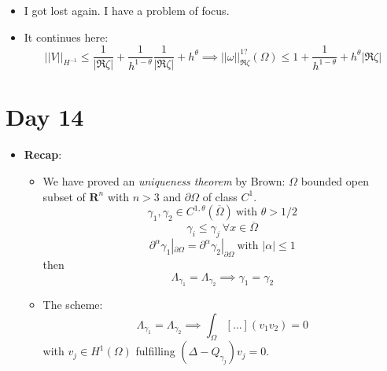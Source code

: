 \documentclass{article}
\begin{document}
\begin{itemize}
    \item I got lost again. I have a problem of focus.

    \item It continues here:
    \begin{equation}
        || V||_{H^{-1}} \leq \frac{1}{|\Re \zeta |} + \frac{1}{h^{1- \theta }} \frac{1}{|\Re \zeta |} + h^\theta \implies ||\omega||^{1?}_{\Re \zeta} (\Omega) \leq 1 + \frac{1}{h^{1 - \theta}} + h^\theta |\Re \zeta|
    \end{equation}
    
\end{itemize}


\section*{Day 14}
\begin{itemize}
    \item \textbf{Recap}:
    \begin{itemize}
        \item We have proved an \textit{uniqueness theorem} by Brown: $\Omega$ bounded open subset of $\mathbf{R}^n$ with $n>3$ and $\partial \Omega $ of class $C^1$.
        \begin{equation}
            \gamma_1, \gamma_2 \in C^{1, \theta}(\overline{\Omega}) \ \text{with } \theta > 1/2
        \end{equation}
        \begin{equation}
            \gamma_i \leq \gamma_j \ \forall x \in \overline{\Omega}
        \end{equation}
        \begin{equation}
            \partial^\alpha \gamma_1 |_{\partial \Omega} = \partial^\alpha \gamma_2 |_{\partial \Omega} \ \text{with } |\alpha| \leq 1
        \end{equation}
        then
        \begin{equation}
            \Lambda_{\gamma_1} = \Lambda_{\gamma_2} \implies \gamma_1 = \gamma_2
        \end{equation}

        \item The scheme:
        \begin{equation}
            \Lambda_{\gamma_1} = \Lambda_{\gamma_2} \implies  \int_\Omega [...] (v_1 v_2) = 0
        \end{equation}
        with $v_j \in H^1(\Omega)$ fulfilling $(\Delta - Q_{\gamma_j}) v_j = 0$.


\end{itemize}
\end{itemize}
\end{document}
